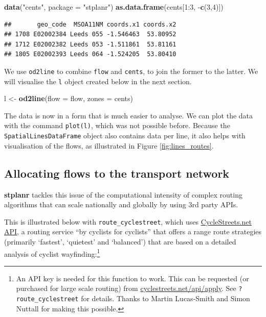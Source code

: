 \documentclass[11pt]{article}
\newenvironment{Shaded}{\begin{snugshade}}{\end{snugshade}}
\newcommand{\KeywordTok}[1]{\textcolor[rgb]{0.13,0.29,0.53}{\textbf{{#1}}}}
\newcommand{\DataTypeTok}[1]{\textcolor[rgb]{0.13,0.29,0.53}{{#1}}}
\newcommand{\DecValTok}[1]{\textcolor[rgb]{0.00,0.00,0.81}{{#1}}}
\newcommand{\StringTok}[1]{\textcolor[rgb]{0.31,0.60,0.02}{{#1}}}
\newcommand{\NormalTok}[1]{{#1}}
\begin{document}
\begin{Shaded}
\begin{Highlighting}[]
\KeywordTok{data}\NormalTok{(}\StringTok{"cents"}\NormalTok{, }\DataTypeTok{package =} \StringTok{"stplanr"}\NormalTok{)}
\KeywordTok{as.data.frame}\NormalTok{(cents[}\DecValTok{1}\NormalTok{:}\DecValTok{3}\NormalTok{, -}\KeywordTok{c}\NormalTok{(}\DecValTok{3}\NormalTok{,}\DecValTok{4}\NormalTok{)])}
\end{Highlighting}
\end{Shaded}

\begin{verbatim}
##       geo_code  MSOA11NM coords.x1 coords.x2
## 1708 E02002384 Leeds 055 -1.546463  53.80952
## 1712 E02002382 Leeds 053 -1.511861  53.81161
## 1805 E02002393 Leeds 064 -1.524205  53.80410
\end{verbatim}

We use \texttt{od2line} to combine \texttt{flow} and \texttt{cents}, to
join the former to the latter. We will visualise the \texttt{l} object
created below in the next section.

\begin{Shaded}
\begin{Highlighting}[]
\NormalTok{l <-}\StringTok{ }\KeywordTok{od2line}\NormalTok{(}\DataTypeTok{flow =} \NormalTok{flow, }\DataTypeTok{zones =} \NormalTok{cents)}
\end{Highlighting}
\end{Shaded}

The data is now in a form that is much easier to analyse. We can plot
the data with the command \texttt{plot(l)}, which was not possible
before. Because the \texttt{SpatialLinesDataFrame} object also contains
data per line, it also helps with visualisation of the flows, as
illustrated in Figure \ref{fig:lines_routes}.

\subsection{Allocating flows to the transport
network}\label{allocating-flows-to-the-transport-network}

\textbf{stplanr} tackles this issue of the computational intensity of
complex routing algorithms that can scale nationally and globally by
using 3rd party APIs.

This is illustrated below with \texttt{route\_cyclestreet}, which uses
\href{http://www.cyclestreets.net/api/}{CycleStreets.net API}, a routing
service ``by cyclists for cyclists'' that offers a range route
strategies (primarily `fastest', `quietest' and `balanced') that are
based on a detailed analysis of cyclist wayfinding:\footnote{An API key
  is needed for this function to work. This can be requested (or
  purchased for large scale routing) from
  \href{https://www.cyclestreets.net/api/apply/}{cyclestreets.net/api/apply}.
  See \texttt{?route\_cyclestreet} for details. Thanks to Martin
  Lucas-Smith and Simon Nuttall for making this possible.}
\end{document}
